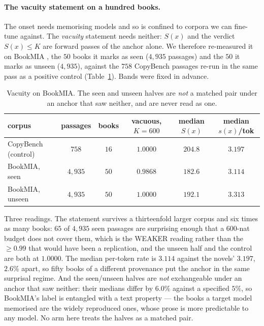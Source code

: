 \paragraph{The vacuity statement on a hundred books.}\label{app:bookmia}
The onset needs memorising models and so is confined to corpora we can fine-tune against. The
\emph{vacuity} statement needs neither: $S(x)$ and the verdict $S(x) \le K$ are forward passes of
the anchor alone. We therefore re-measured it on BookMIA \citep{shi2024detecting}, the $50$ books it
marks as seen ($4{,}935$ passages) and the $50$ it marks as unseen ($4{,}935$), against the $758$
CopyBench passages re-run in the same pass as a positive control (Table~\ref{tab:bookmia}).
Bands were fixed in advance.

\begin{table}[ht]
\centering\footnotesize
\caption{Vacuity on BookMIA. The seen and unseen halves are \emph{not} a matched pair under an anchor that saw neither, and are never read as one.}\label{tab:bookmia}
\setlength{\tabcolsep}{4pt}
\begin{tabular}{@{}lccccc@{}}
\toprule
corpus & passages & books & vacuous, $K = 600$ & median $S(x)$ & median $s(x)$/tok \\
\midrule
CopyBench (control) & $758$   & $16$ & $1.0000$ & $204.8$ & $3.197$ \\
BookMIA, seen       & $4{,}935$ & $50$ & $0.9868$ & $182.6$ & $3.114$ \\
BookMIA, unseen     & $4{,}935$ & $50$ & $1.0000$ & $192.1$ & $3.313$ \\
\bottomrule
\end{tabular}
\end{table}

Three readings. The statement survives a thirteenfold larger corpus and six times as many books:
$65$ of $4{,}935$ seen passages are surprising enough that a $600$-nat budget does not cover them,
which is the WEAKER reading rather than the $\ge 0.99$ that would have been a replication, and the
unseen half and the control are both at $1.0000$. The median per-token rate is $3.114$ against the
novels' $3.197$, $2.6\%$ apart, so fifty books of a different provenance put the anchor in the same
surprisal regime. And the seen/unseen halves are \emph{not} exchangeable under an anchor that saw
neither: their medians differ by $6.0\%$ against a specified $5\%$, so BookMIA's label is entangled
with a text property --- the books a target model memorised are the widely reproduced ones, whose
prose is more predictable to any model. No arm here treats the halves as a matched pair.

